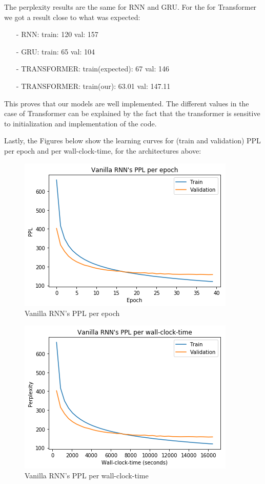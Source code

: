 The perplexity results are the same for RNN and GRU. For the for Transformer we got a result close to what was expected:
\begin{itemize}
	\item[-] RNN: train:  120  val: 157
	\item[-] GRU: train:   65  val: 104
	\item[-] TRANSFORMER:  train(expected):  67  val: 146
	\item[-] TRANSFORMER:  train(our):  63.01  val: 147.11
\end{itemize}

This proves that our models are well implemented. The different values in the case of Transformer can be explained by the fact that the transformer is sensitive to initialization and implementation of the code. 

Lastly, the Figures below show the learning curves for (train and validation) PPL per epoch and per wall-clock-time, for the architectures above:

\begin{figure}[H]
	\centering
	\includegraphics[scale=0.8]{Q4-1_RNN_epoch.png}
	\caption{Vanilla RNN's PPL per epoch}
	\label{fig:fig1}
\end{figure}

\begin{figure}[H]
	\centering
	\includegraphics[scale=0.8]{Q4-1_RNN_clock.png}
	\caption{Vanilla RNN's PPL per wall-clock-time}
	\label{fig:fig2}
\end{figure}

